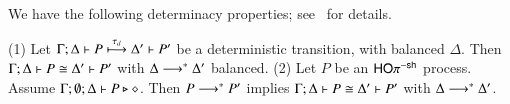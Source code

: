 \documentclass[runningheads]{llncs}
\begin{document}
{%
%
%		
%

We have the following determinacy properties; 
see~\cite{KouzapasPY15}
for details.

\begin{lemma}%
	\label{lem:tau_inert}
	(1)
				Let $\Gamma; \Delta \vdash P \stackrel{\tau_{d}}{\longmapsto} \Delta' \vdash P'$ be a deterministic transition,
				with balanced $\Delta$. Then 
				$\Gamma; \Delta \vdash P \cong \Delta'\vdash P'$ 
				with $\Delta \longrightarrow^\ast \Delta'$ balanced.
				(2) Let $P$ be an $\mathsf{HO}\pi^{-\mathsf{sh}}$ process. 
				Assume $\Gamma; \emptyset; \Delta \vdash P \triangleright \diamond$. Then 
				$P \longrightarrow^\ast P'$ implies $\Gamma; \Delta \vdash 
				P \cong \Delta'\vdash P'$ with $\Delta \longrightarrow^\ast \Delta'$. 
\end{lemma}


}
\end{document}
